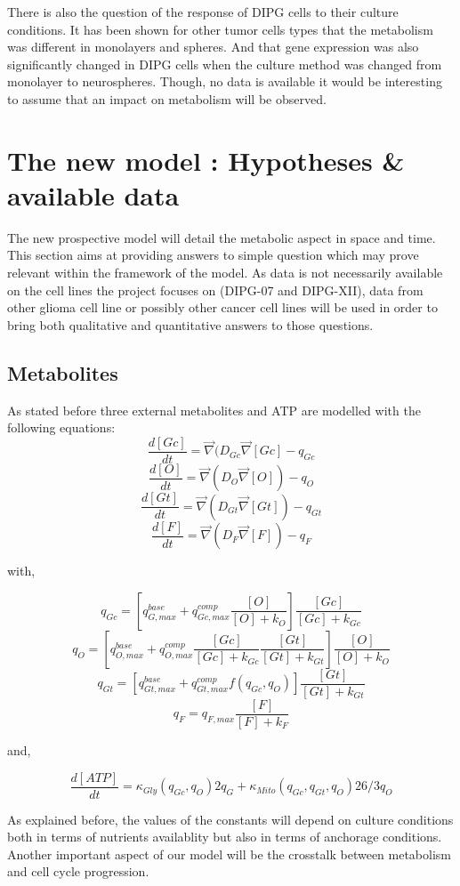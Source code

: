 \documentclass[11pt,a4paper]{article}
\begin{document}
There is also the question of the response of DIPG cells to their culture conditions. It has been shown for other tumor cells types that the metabolism was different in monolayers and spheres.\cite{Natarajan2019} And that  gene expression was also significantly changed in  DIPG cells when the culture method was changed from monolayer to neurospheres.\cite{Meel2017} Though, no data is available it would be interesting to assume that an impact on metabolism will be observed.


\section{The new model : Hypotheses  \& available data}
The new prospective model will detail the metabolic aspect in space and time.
This section aims at providing answers to simple question which may prove relevant within the framework of the model. As data is not necessarily available on the cell lines the project focuses on (DIPG-07 and DIPG-XII), data from other glioma cell line or possibly other cancer cell lines will be used in order to bring both qualitative and quantitative answers to those questions.

\subsection{Metabolites} 
As stated before three external metabolites and ATP are modelled with the following equations: 
\[ \frac{d [Gc]}{d t} = \overrightarrow{\nabla} (D_{Gc} \overrightarrow{\nabla} [Gc] - q_{Gc}  \]
\[ \frac{d [O]}{d t} = \overrightarrow{\nabla} (D_O \overrightarrow{\nabla} [O]) - q_O  \]
\[ \frac{d [Gt]}{d t} = \overrightarrow{\nabla} (D_{Gt} \overrightarrow{\nabla} [Gt]) - q_{Gt}  \]
\[ \frac{d [F]}{d t} = \overrightarrow{\nabla} (D_{F} \overrightarrow{\nabla} [F]) - q_{F}  \]

with,

\[ q_{Gc} =  [ q_{G,max}^{base} + q_{Gc,max}^{comp} \frac{[O]}{[O]+ k_O}] \frac{[Gc]}{[Gc] + k_{Gc}} \]
\[ q_O =  [ q_{O,max}^{base} + q_{O,max}^{comp} \frac{[Gc]}{[Gc]+ k_{Gc}}\frac{[Gt]}{[Gt]+ k_{Gt}}] \frac{[O]}{[O] + k_O} \] 
\[ q_{Gt} =  [ q_{Gt,max}^{base} + q_{Gt,max}^{comp}f(q_{Gc},q_O)] \frac{[Gt]}{[Gt] + k_{Gt}} \]
\[ q_{F} =  q_{F,max} \frac{[F]}{[F] + k_{F}} \]

and,

\[ \frac{d[ATP]}{dt} = \kappa_{Gly} (q_{Gc},q_O) 2q_G + \kappa_{Mito}(q_{Gc},q_{Gt},q_O) 26/3q_O  \] 

As explained before, the values of the constants will depend on culture conditions both in terms of nutrients availablity but also in terms of anchorage conditions. Another important aspect of our model will be the crosstalk between metabolism and cell cycle progression.
\end{document}
